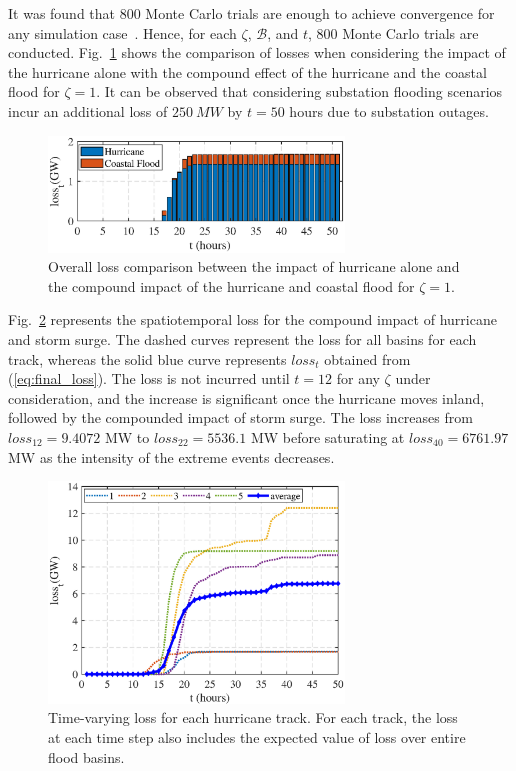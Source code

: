 It was found that 800 Monte Carlo trials are enough to achieve convergence for any simulation case~\cite{9917119}. Hence, for each $\zeta$, $\mathcal{B}$, and $t$, 800 Monte Carlo trials are conducted. Fig.~\ref{fig:hurricane_flood_compound} shows the comparison of losses when considering the impact of the hurricane alone with the compound effect of the hurricane and the coastal flood for $\zeta=1$. It can be observed that considering substation flooding scenarios incur an additional loss of $250~MW$ by $t=50$ hours due to substation outages.   

\begin{figure}
    \centering
    \includegraphics[width=0.7\textwidth]{figures/hurricanevsflood.eps}
    \caption{Overall loss comparison between the impact of hurricane alone and the compound impact of the hurricane and coastal flood for $\zeta = 1$.}
    \label{fig:hurricane_flood_compound}
\end{figure}

Fig.~\ref{fig:final_losses} represents the spatiotemporal loss for the compound impact of hurricane and storm surge. The dashed curves represent the loss for all basins for each track, whereas the solid blue curve represents $loss_t$ obtained from (\ref{eq:final_loss}). The loss is not incurred until $t=12$ for any $\zeta$ under consideration, and the increase is significant once the hurricane moves inland, followed by the compounded impact of storm surge. The loss increases from $loss_{12} = 9.4072$ MW to $loss_{22} = 5536.1$ MW before saturating at $loss_{40} = 6761.97$ MW as the intensity of the extreme events decreases.  

\begin{figure}[!h!]
    \centering
    \includegraphics[width=0.7\textwidth]{figures/all_basin_losses.eps}
    \caption{Time-varying loss for each hurricane track. For each track, the loss at each time step also includes the expected value of loss over entire flood basins.}
    \label{fig:final_losses}
\end{figure}

